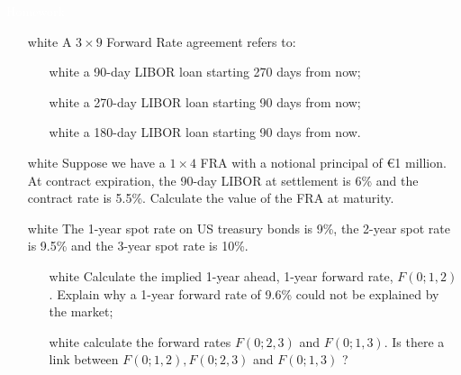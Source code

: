 \documentclass{beamer}
\begin{document}
\begin{homework}
\begin{frame}{\textcolor{white}{Homework}}
\begin{itemize}
	\item[white] A $3\times 9$ Forward Rate agreement refers to:
		\begin{itemize}
			\item[white] a 90-day LIBOR loan starting 270 days from now;
			\item[white] a 270-day LIBOR loan starting 90 days from now;
			\item[white] a 180-day LIBOR loan starting 90 days from now.
		\end{itemize}
	\item[white] Suppose we have a $1\times 4$ FRA with a notional principal of €1 million.  At contract expiration, the 90-day LIBOR at settlement is 6\% and the contract rate is 5.5\%. Calculate the value of the FRA at maturity.
	\item[white] The 1-year spot rate on US treasury bonds is 9\%, the 2-year spot rate is 9.5\% and the 3-year spot rate is 10\%. 
	\begin{itemize}
		\item[white] Calculate the implied 1-year ahead, 1-year forward rate, $F(0;1,2)$. Explain why a 1-year forward rate of 9.6\% could not be explained by the market;
		\item[white] calculate the forward rates  $F(0; 2, 3)$ and $F(0; 1,3)$. Is there a link between $F(0;1,2),F(0;2,3)$ and $F(0;1,3)$ ?
	\end{itemize}
\end{itemize}
\end{frame}
\end{homework}
\end{document}
